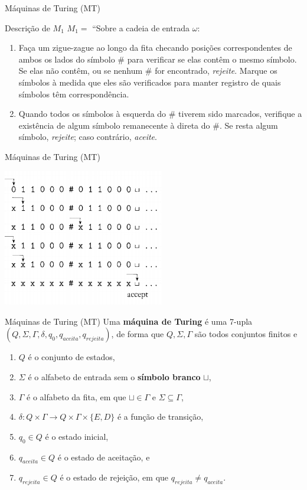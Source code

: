 \documentclass[xcolor=dvipsnames,table]{beamer}
\begin{document}
	\begin{frame}{Máquinas de Turing (MT)}
		\begin{block}{Descrição de $M_1$}
			$M_1 =$ ``Sobre a cadeia de entrada $\omega$:
			\begin{enumerate}
				\item Faça um zigue-zague ao longo da fita checando posições correspondentes de ambos os lados do símbolo $\#$ para verificar se elas contêm o mesmo símbolo. Se elas não contêm, ou se nenhum $\#$ for encontrado, {\it rejeite}. Marque os símbolos à medida que eles são verificados para manter registro de quais símbolos têm correspondência.
				\item Quando todos os símbolos à esquerda do $\#$ tiverem sido marcados, verifique a existência de algum símbolo remanecente à direta do $\#$. Se resta algum símbolo, {\it rejeite}; caso contrário, {\it aceite}.
			\end{enumerate}
		\end{block}
	\end{frame}
	
	\begin{frame}{Máquinas de Turing (MT)}
		\begin{center}
			\includegraphics[height=6cm]{images/fig32.png}
		\end{center}
	\end{frame}	
	
	\begin{frame}{Máquinas de Turing (MT)}
		Uma {\bf máquina de Turing} é uma 7-upla $(Q, \Sigma, \Gamma, \delta, q_0, q_{aceita}, q_{rejeita})$, de forma que $Q, \Sigma, \Gamma$ são todos conjuntos finitos e
		
		\begin{enumerate}
			\item $Q$ é o conjunto de estados,
			\item $\Sigma$ é o alfabeto de entrada sem o {\bf símbolo branco} $\sqcup$,
			\item $\Gamma$ é o alfabeto da fita, em que $\sqcup \in \Gamma$ e $\Sigma \subseteq \Gamma$,
			\item $\delta : Q \times \Gamma \rightarrow Q \times \Gamma \times \{E, D\}$ é a função de transição,
			\item $q_0 \in Q$ é o estado inicial,
			\item $q_{aceita} \in Q$ é o estado de aceitação, e
			\item $q_{rejeita} \in Q$ é o estado de rejeição, em que $q_{rejeita} \not= q_{aceita}$.
		\end{enumerate}
	\end{frame}
	
\end{document}
